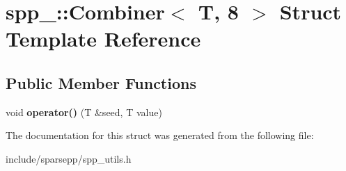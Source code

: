 \hypertarget{structspp___1_1_combiner_3_01_t_00_018_01_4}{}\section{spp\+\_\+\+:\+:Combiner$<$ T, 8 $>$ Struct Template Reference}
\label{structspp___1_1_combiner_3_01_t_00_018_01_4}
\subsection*{Public Member Functions}
\begin{DoxyCompactItemize}
\item 
void {\bfseries operator()} (T \&seed, T value)\hypertarget{structspp___1_1_combiner_3_01_t_00_018_01_4_af33f6513ca59344517b87a62dd898876}{}\label{structspp___1_1_combiner_3_01_t_00_018_01_4_af33f6513ca59344517b87a62dd898876}

\end{DoxyCompactItemize}


The documentation for this struct was generated from the following file\+:\begin{DoxyCompactItemize}
\item 
include/sparsepp/spp\+\_\+utils.\+h\end{DoxyCompactItemize}

